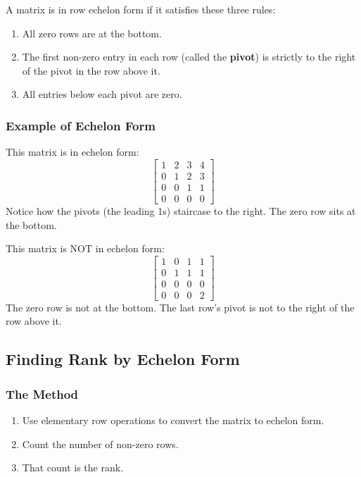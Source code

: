 \documentclass[
]{article}
\providecommand{\tightlist}{%
  \setlength{\itemsep}{0pt}\setlength{\parskip}{0pt}}
\begin{document}
A matrix is in row echelon form if it satisfies these three rules:

\begin{enumerate}
\def\labelenumi{\arabic{enumi}.}
\tightlist
\item
  All zero rows are at the bottom.
\item
  The first non-zero entry in each row (called the \textbf{pivot}) is
  strictly to the right of the pivot in the row above it.
\item
  All entries below each pivot are zero.
\end{enumerate}

\subsubsection{Example of Echelon Form}\label{example-of-echelon-form}

This matrix is in echelon form:
\[
\begin{bmatrix}
1 & 2 & 3 & 4 \\
0 & 1 & 2 & 3 \\
0 & 0 & 1 & 1 \\
0 & 0 & 0 & 0
\end{bmatrix}
\]
Notice how the pivots (the leading 1s) staircase to the right. The zero
row sits at the bottom.

This matrix is NOT in echelon form:
\[
\begin{bmatrix}
1 & 0 & 1 & 1 \\
0 & 1 & 1 & 1 \\
0 & 0 & 0 & 0 \\
0 & 0 & 0 & 2
\end{bmatrix}
\]
The zero row is not at the bottom. The last row's pivot is not to the
right of the row above it.

\subsection{Finding Rank by Echelon
Form}\label{finding-rank-by-echelon-form}

\subsubsection{The Method}\label{the-method-1}

\begin{enumerate}
\def\labelenumi{\arabic{enumi}.}
\tightlist
\item
  Use elementary row operations to convert the matrix to echelon form.
\item
  Count the number of non-zero rows.
\item
  That count is the rank.
\end{enumerate}
\end{document}
